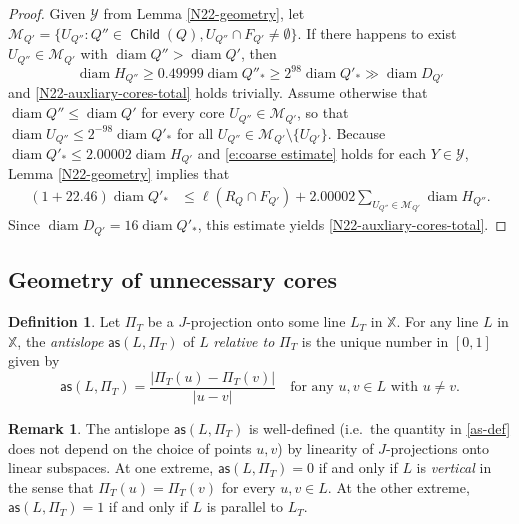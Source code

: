 \documentclass[12pt]{amsart}
\numberwithin{equation}{section}
\theoremstyle{plain}
\theoremstyle{definition}
\newtheorem{remark}[theorem]{Remark}
\newtheorem{definition}[theorem]{Definition}
\def\XX{{\mathbb{X}}}
\newcommand{\diam}{\mathop\mathrm{diam}\nolimits}
\newcommand{\Child}{\mathop\mathsf{Child}\nolimits}
\numberwithin{figure}{section}
\begin{document}
\begin{proof} Given $\mathcal{Y}$ from Lemma \ref{N22-geometry}, let $\mathcal{M}_{Q'}=\{U_{Q''}:Q''\in\Child(Q), U_{Q''}\cap F_{Q'}\neq\emptyset\}.$ If there happens to exist $U_{Q''} \in \mathcal{M}_{Q'}$ with $\diam Q'' > \diam Q'$, then $$\diam H_{Q''} \ge 0.49999\diam Q''_*\geq 2^{98}\diam Q'_*\gg \diam D_{Q'}$$ and \eqref{N22-auxliary-cores-total} holds trivially. Assume otherwise that $\diam Q'' \le \diam Q'$ for every core $U_{Q''} \in \mathcal{M}_{Q'}$, so that $\diam U_{Q''}\leq 2^{-98}\diam Q'_*$ for all $U_{Q''} \in \mathcal{M}_{Q'}\setminus\{U_{Q'}\}$. Because $\diam Q'_*\leq 2.00002\diam H_{Q'}$ and \eqref{e:coarse estimate} holds for  each $Y\in\mathcal{Y}$, Lemma \ref{N22-geometry} implies that
\begin{align}\label{e:N22 ineq}
    (1+22.46)\diam Q'_* & \le \ell(R_Q\cap F_{Q'}) + 2.00002 \sum_{U_{Q''}\in\mathcal{M}_{Q'}} \diam H_{Q''}.
\end{align}
Since $\diam D_{Q'}=16\diam Q'_*$, this estimate yields \eqref{N22-auxliary-cores-total}.\end{proof}

\subsection{Geometry of unnecessary cores}

\begin{definition} Let $\Pi_T$ be a $J$-projection onto some line $L_T$ in $\XX$. For any line $L$ in $\XX$, the \emph{antislope} $\mathsf{as}(L,\Pi_T)$ of $L$ \emph{relative to} $\Pi_T$ is the unique number in $[0,1]$ given by \begin{equation}\label{as-def}\mathsf{as}(L,\Pi_T)=\frac{|\Pi_T(u)-\Pi_T(v)|}{|u-v|}\quad\text{for any }u,v\in L\text{ with }u\neq v.\end{equation}\end{definition}

\begin{remark}The antislope $\mathsf{as}(L,\Pi_T)$ is well-defined (i.e.~the quantity in \eqref{as-def} does not depend on the choice of points $u,v$) by linearity of $J$-projections onto linear subspaces. At one extreme, $\mathsf{as}(L,\Pi_T)=0$ if and only if $L$ is \emph{vertical} in the sense that $\Pi_T(u)=\Pi_T(v)$ for every $u,v\in L$. At the other extreme, $\mathsf{as}(L,\Pi_T)=1$ if and only if $L$ is parallel to $L_T$.\end{remark}
\end{document}
